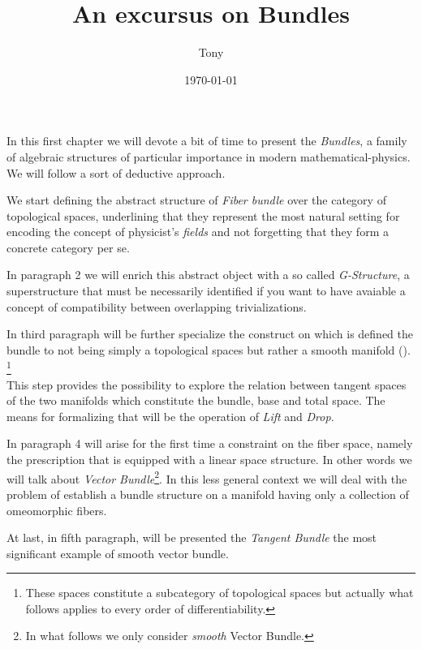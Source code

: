 \documentclass[a4paper,12pt]{scrartcl}    %
\begin{document}
	\title{An excursus on Bundles}
	\author{Tony}
	\date{\today}
\maketitle





\tableofcontents


\newpage



In this first chapter we will devote a bit of time to present the \emph{Bundles}, a family of algebraic structures of particular importance in modern mathematical-physics.
\\
We will follow a sort of deductive approach.

We start defining the abstract structure of \emph{Fiber bundle} over the category of topological spaces, underlining that they represent the most natural setting for encoding the concept of physicist's \emph{fields} and not forgetting that they form a concrete category per se.

In paragraph 2 we will enrich this abstract object with a so called \emph{G-Structure}, a superstructure that must be necessarily identified if you want to have avaiable a concept of compatibility between overlapping trivializations.

In third paragraph will be further specialize the construct on which is defined the bundle to not being simply a topological spaces but rather a smooth manifold (). \footnote{These spaces constitute a subcategory of topological spaces but actually what follows applies to every order of differentiability.}
\\
This step provides the possibility to explore the relation between tangent spaces of the two manifolds which constitute the bundle, base and total space. The means for formalizing that will be the operation of \emph{Lift} and \emph{Drop}.

In paragraph 4 will arise for the first time a constraint on the fiber space, namely the prescription that is equipped with a linear space structure. In other words we will talk about \emph{Vector Bundle}\footnote{In what follows we only consider \emph{smooth} Vector Bundle.}.
In this less general context we will deal with the problem of establish a bundle structure on a manifold having only a collection of omeomorphic fibers.

At last, in fifth paragraph, will be presented the \emph{Tangent Bundle} the most significant example of smooth vector bundle.
\end{document}
